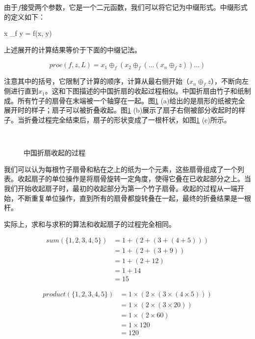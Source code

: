 \documentclass[UTF8]{article}
\begin{document}
由于$f$接受两个参数，它是一个二元函数，我们可以将它记为中缀形式。中缀形式的定义如下：

\be
x \oplus_f y = f(x, y)
\ee

上述展开的计算结果等价于下面的中缀记法。

\[
proc(f, z, L) = x_1 \oplus_f (x_2 \oplus_f (... (x_n \oplus_f z))...)
\]

注意其中的括号，它限制了计算的顺序，计算从最右侧开始（$x_n \oplus_f z$），不断向左侧进行直到$x_1$。这和下图描述的中国折扇的收起过程相似。中国折扇由竹子和纸制成。所有竹子的扇骨在末端被一个轴穿在一起。图\ref{fig:fold-fan} (a)给出的是扇形的纸被完全展开时的样子；扇子可以被折叠收起。图\ref{fig:fold-fan} (b)展示了扇子右侧被部分收起时的样子。当折叠过程完全结束后，扇子的形状变成了一根杆状，如图\ref{fig:fold-fan} (c)所示。

\begin{figure}[htbp]
    \centering
     \\
    \caption{中国折扇收起的过程} \label{fig:fold-fan}
\end{figure}

我们可以认为每根竹子扇骨和粘在之上的纸为一个元素，这些扇骨组成了一个列表。收起扇子的单位操作是将扇骨旋转一定角度，使得它叠在已收起部分之上。当我们开始收起扇子时，最初的收起部分为第一个竹子扇骨。收起的过程从一端开始，不断重复单位操作，直到所有的扇骨都旋转叠在一起，最终的折叠结果是一根杆。

实际上，求和与求积的算法和收起扇子的过程完全相同。

\[
\begin{array}{rl}
sum(\{1, 2, 3, 4, 5 \}) & = 1 + (2 + (3 + (4 + 5))) \\
         & = 1 + (2 + (3 + 9)) \\
         & = 1 + (2 + 12) \\
         & = 1 + 14 \\
         & = 15
\end{array}
\]

\[
\begin{array}{rl}
product(\{1, 2, 3, 4, 5 \}) & = 1 \times (2 \times (3 \times (4 \times 5))) \\
         & = 1 \times (2 \times (3 \times 20)) \\
         & = 1 \times (2 \times 60) \\
         & = 1 \times 120 \\
         & = 120
\end{array}
\]
\end{document}

